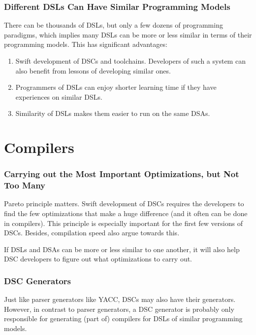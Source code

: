 \documentclass[11pt]{article}
\begin{document}

\subsubsection*{Different DSLs Can Have Similar Programming Models}
There can be thousands of DSLs, but only a few dozens of programming paradigms, which implies many DSLs can be more or less similar in terms of their programming models.
This has significant advantages:
\begin{enumerate}
    \item Swift development of DSCs and toolchains.
    Developers of such a system can also benefit from lessons of developing similar ones.
    \item Programmers of DSLs can enjoy shorter learning time if they have experiences on similar DSLs.
    \item Similarity of DSLs makes them easier to run on the same DSAs.
\end{enumerate}
\section{Compilers}
\subsubsection*{Carrying out the Most Important Optimizations, but Not Too Many}
Pareto principle matters.
Swift development of DSCs requires the developers to find the few optimizations that make a huge difference (and it often can be done in compilers).
This principle is especially important for the first few versions of DSCs.
Besides, compilation speed also argue towards this.

If DSLs and DSAs can be more or less similar to one another, it will also help DSC developers to figure out what optimizations to carry out.
\subsubsection*{DSC Generators}
Just like parser generators like YACC, DSCs may also have their generators.
However, in contrast to parser generators, a DSC generator is probably only responsible for generating (part of) compilers for DSLs of similar programming models.
\end{document}
